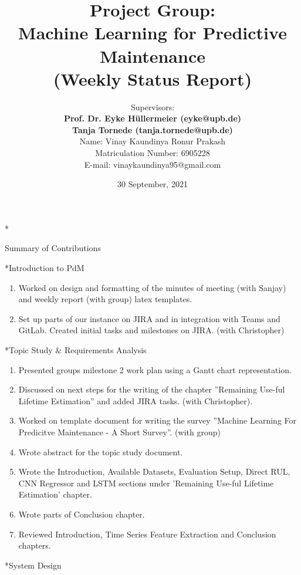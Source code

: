 \documentclass[11pt,a4paper]{article}
\title{Project Group:\\
\textbf{Machine Learning for Predictive Maintenance}\\
(Weekly Status Report)}
\author{Supervisors:\\
\textbf{Prof. Dr. Eyke H{\"u}llermeier (eyke@upb.de)}\\
\textbf{Tanja Tornede (tanja.tornede@upb.de)}\\ 
\vspace{10mm}
Name: Vinay Kaundinya Ronur Prakash \\
Matriculation Number: 6905228\\
E-mail: vinaykaundinya95@gmail.com
}
\date{}
\begin{document}
\maketitle
\thispagestyle{empty}

\clearpage
{}

\newpage
\begin{section}*{Summary of Contributions \hfill \date{30 September, 2021}}
 \begin{refsection}
     \begin{subsection}*{Introduction to PdM}
         \begin{enumerate}
             \item Worked on design and formatting of the minutes of meeting (with Sanjay) and weekly report (with group) latex templates.
             \item Set up parts of our instance on JIRA and in integration with Teams and GitLab. Created initial tasks and milestones on JIRA. (with Christopher)
         \end{enumerate}
     \end{subsection}
     \begin{subsection}*{Topic Study \& Requirements Analysis}
         \begin{enumerate}
             \item Presented groups milestone 2 work plan using a Gantt chart representation.
             \item Discussed on next steps for the writing of the chapter ”Remaining Use-ful Lifetime Estimation” and added JIRA tasks. (with Christopher).
             \item Worked on template document for writing the survey ”Machine Learning For Predicitve Maintenance - A Short Survey”. (with group)
             \item Wrote abstract for the topic study document.
             \item Wrote the Introduction, Available Datasets, Evaluation Setup, Direct RUL, CNN Regressor and LSTM sections under 'Remaining Use-ful Lifetime Estimation' chapter.
             \item Wrote parts of Conclusion chapter.
             \item Reviewed Introduction, Time Series Feature Extraction and Conclusion chapters.
         \end{enumerate}
     \end{subsection}
     \begin{subsection}*{System Design}

\end{subsection}
\end{refsection}
\end{section}
\end{document}
